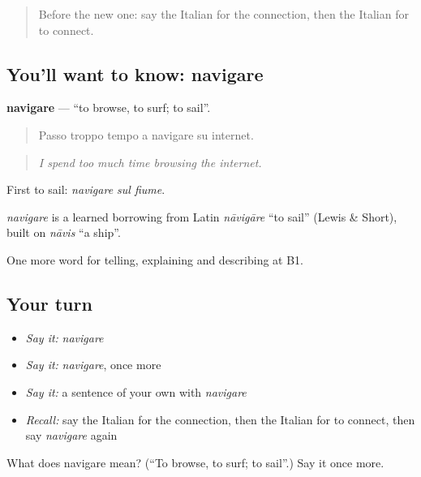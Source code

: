 \begin{quote}
Before the new one: say the Italian for the connection, then the Italian for to connect.
\end{quote}

\subsection*{You'll want to know: navigare}
\textbf{navigare} — \textquotedblleft{}to browse, to surf; to sail\textquotedblright{}.

\begin{quote}
Passo troppo tempo a navigare su internet.
\end{quote}

\begin{quote}
\emph{I spend too much time browsing the internet.}
\end{quote}

First to sail: \emph{navigare sul fiume}.

\begin{cousinweb}
\emph{navigare} is a learned borrowing from Latin \emph{nāvigāre} \textquotedblleft{}to sail\textquotedblright{} (Lewis \& Short), built on \emph{nāvis} \textquotedblleft{}a ship\textquotedblright{}.
\end{cousinweb}

\begin{grammarlens}[title={What you've built}]
One more word for telling, explaining and describing at B1.
\end{grammarlens}

\subsection*{Your turn}
\begin{itemize}
\raggedright
  \item \emph{Say it:} \emph{navigare}
  \item \emph{Say it:} \emph{navigare}, once more
  \item \emph{Say it:} a sentence of your own with \emph{navigare}
  \item \emph{Recall:} say the Italian for the connection, then the Italian for to connect, then say \emph{navigare} again
\end{itemize}

\begin{tcolorbox}[breakable,colback=teal!4,colframe=teal!35!black,title={Before you move on}]
What does navigare mean? (\textquotedblleft{}To browse, to surf; to sail\textquotedblright{}.) Say it once more.
\end{tcolorbox}

